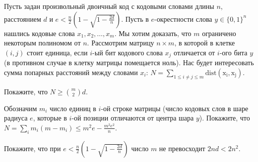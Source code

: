 Пусть задан произвольный двоичный код с кодовыми словами длины $n$, расстоянием $d$ и $e < \frac{n}{2}(1 -
\sqrt{1 - \frac{2d}{n}})$. Пусть в $e$-окрестности слова $y \in \{0, 1\}^n$ нашлись кодовые слова $x_1, x_2, \dots, x_m$. Мы
хотим доказать, что $m$ ограничено некоторым полиномом от $n$. Рассмотрим матрицу $n \times m$, в которой в клетке $(i, j)$
стоит единица, если $i$-ый бит кодового слова $x_j$ отличается от $i$-ого бита $y$ (в противном случае в клетку матрицы
помещается ноль). Нас будет интересовать сумма попарных расстояний между словами $x_i$: $N =
\sum\limits_{1 \le i \neq j \le m} \mathrm{dist(x_i, x_j)}$.
\begin{enumcyr}
    \item Покажите, что $N \ge \binom{m}{2} d$.
    \item Обозначим $m_i$ число единиц в $i$-ой строке матрицы (число кодовых слов в шаре радиуса $e$, которые в $i$-ой
    	позиции отличаются от центра шара $y$). Покажите, что $N = \sum\limits_{i} m_i (m - m_i) \le m^2 e -
		\frac{m^2 e^2}{n}$.
    \item Покажите, что при $e < \frac{n}{2}(1 - \sqrt{1 - \frac{2d}{n}})$ число $m$ не превосходит $2nd < 2n^2$.
\end{enumcyr}